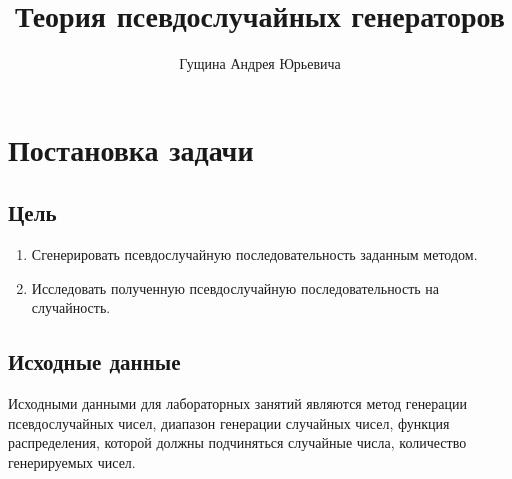 \documentclass[spec, och, labwork]{SCWorks}
\title{Теория псевдослучайных генераторов}
\author{Гущина Андрея Юрьевича} %
\begin{document}

\tableofcontents

\section{Постановка задачи}

\subsection{Цель}
\begin{enumerate}
  \item Сгенерировать псевдослучайную последовательность заданным методом.
  \item Исследовать полученную псевдослучайную последовательность на случайность.
\end{enumerate}

\subsection{Исходные данные}
Исходными данными для лабораторных занятий являются метод генерации
псевдослучайных чисел, диапазон генерации случайных чисел, функция
распределения, которой должны подчиняться случайные числа, количество
генерируемых чисел.
\end{document}
